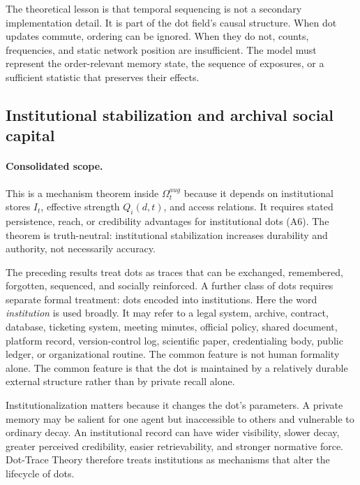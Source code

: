 \documentclass[11pt]{article}
\theoremstyle{remark}
\begin{document}
The theoretical lesson is that temporal sequencing is not a secondary
implementation detail. It is part of the dot field's causal structure.
When dot updates commute, ordering can be ignored. When they do not,
counts, frequencies, and static network position are insufficient. The
model must represent the order-relevant memory state, the sequence of
exposures, or a sufficient statistic that preserves their effects.

\subsection{Institutional stabilization and archival social capital}\label{institutional-stabilization}

\paragraph{Consolidated scope.} This is a mechanism theorem inside $\Omega_t^{aug}$ because it depends on institutional stores $I_t$, effective strength $Q_i(d,t)$, and access relations. It requires stated persistence, reach, or credibility advantages for institutional dots (A6). The theorem is truth-neutral: institutional stabilization increases durability and authority, not necessarily accuracy.

The preceding results treat dots as traces that can be exchanged,
remembered, forgotten, sequenced, and socially reinforced. A further
class of dots requires separate formal treatment: dots encoded into
institutions. Here the word \emph{institution} is used broadly. It may
refer to a legal system, archive, contract, database, ticketing system,
meeting minutes, official policy, shared document, platform record,
version-control log, scientific paper, credentialing body, public
ledger, or organizational routine. The common feature is not human
formality alone. The common feature is that the dot is maintained by a
relatively durable external structure rather than by private recall
alone.

Institutionalization matters because it changes the dot's parameters. A
private memory may be salient for one agent but inaccessible to others
and vulnerable to ordinary decay. An institutional record can have wider
visibility, slower decay, greater perceived credibility, easier
retrievability, and stronger normative force. Dot-Trace Theory therefore
treats institutions as mechanisms that alter the lifecycle of dots.
\end{document}
